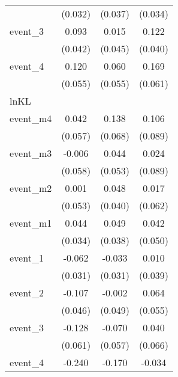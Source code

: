 \begin{table}[htbp]
\begin{tabular}{l*{3}{c}}
            &     (0.032)         &     (0.037)         &     (0.034)         \\
[1em]
event\_3     &       0.093\sym{*}  &       0.015         &       0.122\sym{**} \\
            &     (0.042)         &     (0.045)         &     (0.040)         \\
[1em]
event\_4     &       0.120\sym{*}  &       0.060         &       0.169\sym{**} \\
            &     (0.055)         &     (0.055)         &     (0.061)         \\
\hline
lnKL        &                     &                     &                     \\
event\_m4    &       0.042         &       0.138\sym{*}  &       0.106         \\
            &     (0.057)         &     (0.068)         &     (0.089)         \\
[1em]
event\_m3    &      -0.006         &       0.044         &       0.024         \\
            &     (0.058)         &     (0.053)         &     (0.089)         \\
[1em]
event\_m2    &       0.001         &       0.048         &       0.017         \\
            &     (0.053)         &     (0.040)         &     (0.062)         \\
[1em]
event\_m1    &       0.044         &       0.049         &       0.042         \\
            &     (0.034)         &     (0.038)         &     (0.050)         \\
[1em]
event\_1     &      -0.062\sym{*}  &      -0.033         &       0.010         \\
            &     (0.031)         &     (0.031)         &     (0.039)         \\
[1em]
event\_2     &      -0.107\sym{*}  &      -0.002         &       0.064         \\
            &     (0.046)         &     (0.049)         &     (0.055)         \\
[1em]
event\_3     &      -0.128\sym{*}  &      -0.070         &       0.040         \\
            &     (0.061)         &     (0.057)         &     (0.066)         \\
[1em]
event\_4     &      -0.240\sym{**} &      -0.170\sym{**} &      -0.034         \\

\end{tabular}
\end{table}
